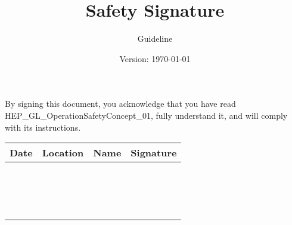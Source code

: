 \documentclass{article}
\title{Safety Signature}
\author{Guideline}
\date{Version: \isodate\today}
\begin{document}
\maketitle

\thispagestyle{fancy}
\noindent
By signing this document, you acknowledge that you have read HEP\_GL\_OperationSafetyConcept\_01, fully understand it, and will comply with its instructions. 
\renewcommand{\arraystretch}{2}
\begin{tabularx}{\textwidth}{|X|X|X|X|}
    \hline
    \rowcolor{tableHeaderColor} 
    \begin{minipage}[t]{\linewidth}
        \textbf{Date} 
    \end{minipage}
    & 
    \textbf{Location} 
    & 
    \textbf{Name} 
    & 
    \textbf{Signature} 
    \\ \hline
    & & & \\ \hline
    & & & \\ \hline
    & & & \\ \hline
    & & & \\ \hline
    & & & \\ \hline
    & & & \\ \hline
    & & & \\ \hline
    & & & \\ \hline
    & & & \\ \hline
    & & & \\ \hline
    & & & \\ \hline
    & & & \\ \hline
    & & & \\ \hline
    & & & \\ \hline
    & & & \\ \hline
    & & & \\ \hline
\end{tabularx}
\end{document}
